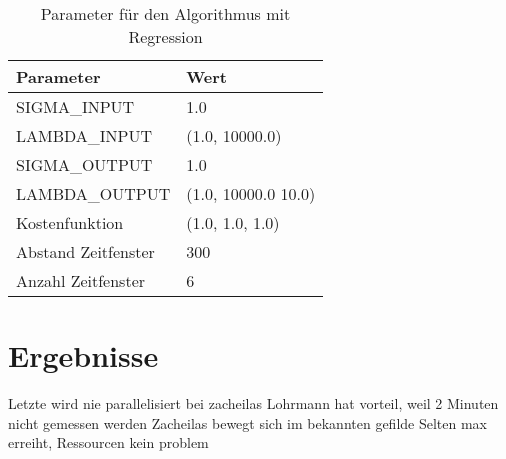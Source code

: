 \begin{table}
\caption{Parameter für den Algorithmus mit Regression} 
\centering
\begin{tabular}{ll}
\hline
\textbf{Parameter} & \textbf{Wert} \\ \hline
SIGMA\_INPUT & 1.0 \\
LAMBDA\_INPUT & (1.0, 10000.0) \\
SIGMA\_OUTPUT & 1.0 \\
LAMBDA\_OUTPUT & (1.0, 10000.0 10.0) \\
Kostenfunktion & (1.0, 1.0, 1.0) \\
Abstand Zeitfenster & 300 \\
Anzahl Zeitfenster & 6 \\
\hline
\end{tabular}
\end{table}

\section{Ergebnisse}




Letzte wird nie parallelisiert bei zacheilas
Lohrmann hat vorteil, weil 2 Minuten nicht gemessen werden
Zacheilas bewegt sich im bekannten gefilde
Selten max erreiht, Ressourcen kein problem

